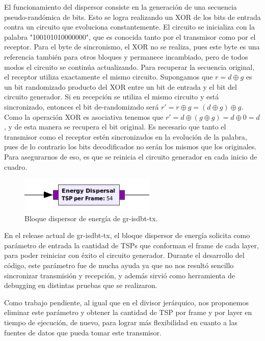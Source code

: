 El funcionamiento del dispersor consiste en la generación de una secuencia pseudo-randómica de bits. Esto se logra realizando un XOR de los bits de entrada contra un circuito que evoluciona constantemente. El circuito se inicializa con la palabra "100101010000000", que es conocida tanto por el transmisor como por el receptor. Para el byte de sincronismo, el XOR no se realiza, pues este byte es una referencia también para otros bloques y permanece incambiado, pero de todos modos el circuito se continúa actualizando.
Para recuperar la secuencia original, el receptor utiliza exactamente el mismo circuito. Supongamos que $r = d \oplus g$ es un bit randomizado producto del XOR entre un bit de entrada y el bit del circuito generador. Si en recepción se utiliza el mismo circuito y está sincronizado, entonces el bit de-randomizado será $r' = r \oplus g = (d \oplus g) \oplus g$. Como la operación XOR es asociativa tenemos que $r' = d \oplus (g \oplus g) = d \oplus 0 = d$, y de esta manera se recupera el bit original.
Es necesario que tanto el transmisor como el receptor estén sincronizados en la evolución de la palabra, pues de lo contrario los bits decodificados no serán los mismos que los originales. Para asegurarnos de eso, es que se reinicia el circuito generador en cada inicio de cuadro.

\begin{figure}[h!]
	\centering
	\includegraphics[scale=0.5]{figuras/cap05/energy}
	\caption{\label{f:energy} Bloque dispersor de energía de gr-isdbt-tx.}
\end{figure}

En el release actual de gr-isdbt-tx, el bloque dispersor de energía solicita como parámetro de entrada la cantidad de TSPs que conforman el frame de cada layer, para poder reiniciar con éxito el circuito generador. Durante el desarrollo del código, este parámetro fue de mucha ayuda ya que no nos resultó sencillo sincronizar transmisión y recepción, y además sirvió como herramienta de debugging en distintas pruebas que se realizaron. 

Como trabajo pendiente, al igual que en el divisor jerárquico, nos proponemos eliminar este parámetro y obtener la cantidad de TSP por frame y por layer en tiempo de ejecución, de nuevo, para lograr más flexibilidad en cuanto a las fuentes de datos que pueda tomar este transmisor. 
	
